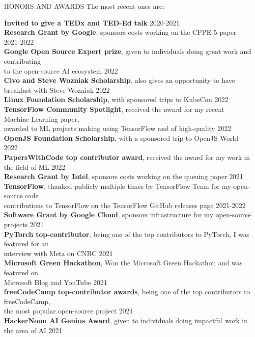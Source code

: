 \documentclass{resume} %
\begin{document}
\begin{rSection}{HONORS AND AWARDS}
The most recent ones are:

{\bf Invited to give a TEDx and TED-Ed talk} \hfill {2020-2021}\\
{\bf Research Grant by Google}, sponsors costs working on the CPPE-5 paper \hfill {2021-2022}\\
{\bf Google Open Source Expert prize}, given to individuals doing great work and contributing \\ to the open-source AI ecosystem \hfill {2022}\\
{\bf Civo and Steve Wozniak Scholarship}, also gives an opportunity to have breakfast with Steve Wozniak \hfill {2022}\\
{\bf Linux Foundation Scholarship}, with sponsored trips to KubeCon \hfill {2022}\\
{\bf TensorFlow Community Spotlight}, received the award for my recent Machine Learning paper,\\awarded to ML projects making using TensorFlow and of high-quality \hfill {2022}\\
{\bf OpenJS Foundation Scholarship}, with a sponsored trip to OpenJS World \hfill {2022}\\
{\bf PapersWithCode top contributor award}, received the award for my work in the field of ML \hfill {2022}\\
{\bf Research Grant by Intel}, sponsors costs working on the queuing paper \hfill {2021}\\
{\bf TensorFlow}, thanked publicly multiple times by TensorFlow Team for my open-source code\\contributions to TensorFlow on the TensorFlow GitHub releases page \hfill {2021-2022}\\
{\bf Software Grant by Google Cloud}, sponsors infrastructure for my open-source projects \hfill {2021}\\
{\bf PyTorch top-contributor}, being one of the top contributors to PyTorch, I was featured for an \\ interview with Meta on CNBC \hfill {2021}\\
{\bf Microsoft Green Hackathon}, Won the Microsoft Green Hackathon and was featured on\\Microsoft Blog and YouTube \hfill {2021}\\
{\bf freeCodeCamp top-contributor awards}, being one of the top contributors to freeCodeCamp,\\ the most popular open-source project \hfill {2021}\\
{\bf HackerNoon AI Genius Award}, given to individuals doing impactful work in the area of AI \hfill {2021}
\end{rSection}
\end{document}
